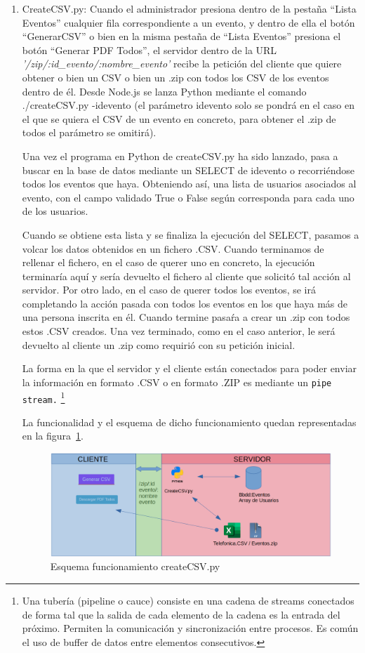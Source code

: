 \documentclass[a4paper, 12pt]{book}
\begin{document}
\begin{enumerate}
  	\item CreateCSV.py: Cuando el administrador presiona dentro de la pestaña ``Lista Eventos'' cualquier fila correspondiente a un evento, y dentro de ella el botón ``GenerarCSV'' o bien en la misma pestaña de ``Lista Eventos'' presiona el botón ``Generar PDF Todos'', el servidor dentro de la URL \textit{'/zip/:id\_evento/:nombre\_evento'} recibe la petición del cliente que quiere obtener o bien un CSV o bien un .zip con todos los CSV de los eventos dentro de él. Desde Node.js se lanza Python mediante el comando ./createCSV.py -idevento (el parámetro idevento solo se pondrá en el caso en el que se quiera el CSV de un evento en concreto, para obtener el .zip de todos el parámetro se omitirá).
  	
  	Una vez el programa en Python de createCSV.py ha sido lanzado, pasa a buscar en la base de datos mediante un SELECT de idevento o recorriéndose todos los eventos que haya. Obteniendo así, una lista de usuarios asociados al evento, con el campo validado True o False según corresponda para cada uno de los usuarios.
  	
  	Cuando se obtiene esta lista y se finaliza la ejecución del SELECT, pasamos a volcar los datos obtenidos en un fichero .CSV. Cuando terminamos de rellenar el fichero, en el caso de querer uno en concreto, la ejecución terminaría aquí y sería devuelto el fichero al cliente que solicitó tal acción al servidor. Por otro lado, en el caso de querer todos los eventos, se irá completando la acción pasada con todos los eventos en los que haya más de una persona inscrita en él. Cuando termine pasaŕa a crear un .zip con todos estos .CSV creados. Una vez terminado, como en el caso anterior, le será devuelto al cliente un .zip como requirió con su petición inicial.
  	
  	La forma en la que el servidor y el cliente están conectados para poder enviar la información en formato .CSV o en formato .ZIP es mediante un \texttt{pipe stream.} 
\footnote{Una tubería (pipeline o cauce) consiste en una cadena de streams conectados de forma tal que la salida de cada elemento de la cadena es la entrada del próximo. Permiten la comunicación y sincronización entre procesos. Es común el uso de buffer de datos entre elementos consecutivos.}
  	
  	La funcionalidad y el esquema de dicho funcionamiento quedan representadas en la figura~\ref{fig:createCSV}.

\begin{figure}[h!]
  \centering
  \includegraphics[width=16cm, keepaspectratio]{img/createCSV.png}
  	\caption{Esquema funcionamiento createCSV.py}\label{fig:createCSV}
\end{figure}  	
  	

\end{enumerate}
\end{document}
